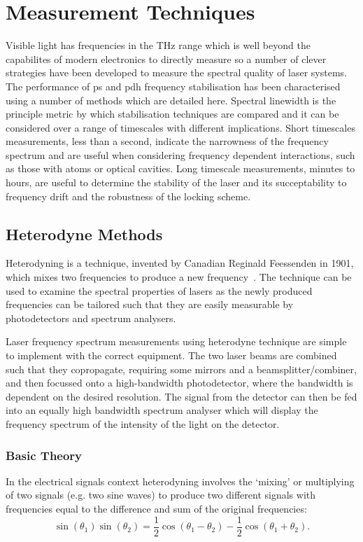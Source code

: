 \section{Measurement Techniques}
Visible light has frequencies in the THz range which is well beyond the capabilites of modern electronics to directly measure so a number of clever strategies have been developed to measure the spectral quality of laser systems.
The performance of \gls*{ps} and \gls{pdh} frequency stabilisation has been characterised using a number of methods which are detailed here.
Spectral linewidth is the principle metric by which stabilisation techniques are compared and it can be considered over a range of timescales with different implications.
Short timescales measurements, less than a second, indicate the narrowness of the frequency spectrum and are useful when considering frequency dependent interactions, such as those with atoms or optical cavities.
Long timescale measurements, minutes to hours, are useful to determine the stability of the laser and its succeptability to frequency drift and the robustness of the locking scheme.

\subsection{Heterodyne Methods}

Heterodyning is a technique, invented by Canadian Reginald Feessenden in 1901, which mixes two frequencies to produce a new frequency~\cite{cooper_physics_2001}.
The technique can be used to examine the spectral properties of lasers as the newly produced frequencies can be tailored such that they are easily measurable by photodetectors and spectrum analysers.

Laser frequency spectrum measurements using heterodyne technique are simple to implement with the correct equipment.
The two laser beams are combined such that they copropagate, requiring some mirrors and a beamsplitter/combiner, and then focussed onto a high-bandwidth photodetector, where the bandwidth is dependent on the desired resolution.
The signal from the detector can then be fed into an equally high bandwidth spectrum analyser which will display the frequency spectrum of the intensity of the light on the detector.

\subsubsection{Basic Theory}
In the electrical signals context heterodyning involves the `mixing' or multiplying of two signals (e.g. two sine waves) to produce two different signals with frequencies equal to the difference and sum of the original frequencies:
\begin{equation}
\sin(\theta_1)\sin(\theta_2) = \frac{1}{2} \cos(\theta_1-\theta_2) - \frac{1}{2} \cos(\theta_1+\theta_2).
\end{equation}

